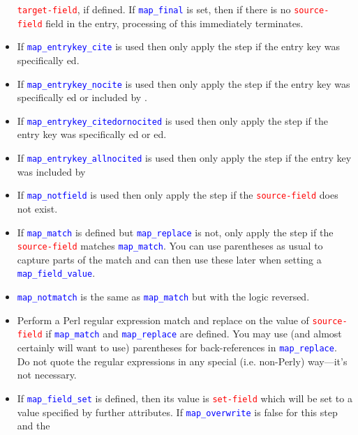 \documentclass{ltxdockit}
\begin{document}
\begin{itemize}
  \textcolor{red}{\texttt{target-field}}, if defined. If
  \textcolor{blue}{\texttt{map\_final}} is set, then if there is no
  \textcolor{red}{\texttt{source-field}} field in the entry, processing of
  this  immediately terminates.
\item If \textcolor{blue}{\texttt{map\_entrykey\_cite}} is used then only apply
  the step if the entry key was specifically ed.
\item If \textcolor{blue}{\texttt{map\_entrykey\_nocite}} is used then only apply
  the step if the entry key was specifically ed or included by .
\item If \textcolor{blue}{\texttt{map\_entrykey\_citedornocited}} is used then only apply
  the step if the entry key was specifically ed or ed.
\item If \textcolor{blue}{\texttt{map\_entrykey\_allnocited}} is used then only apply
  the step if the entry key was included by 
\item If \textcolor{blue}{\texttt{map\_notfield}} is used then only apply
  the step if the \textcolor{red}{\texttt{source-field}} does not exist.
\item If \textcolor{blue}{\texttt{map\_match}} is defined but
  \textcolor{blue}{\texttt{map\_replace}} is not, only apply the
  step if the \textcolor{red}{\texttt{source-field}} matches
  \textcolor{blue}{\texttt{map\_match}}. You can use parentheses as usual
  to capture parts of the match and can then use these later when setting a \textcolor{blue}{\texttt{map\_field\_value}}.
\item \textcolor{blue}{\texttt{map\_notmatch}} is the same as
  \textcolor{blue}{\texttt{map\_match}} but with the logic reversed.
\item Perform a Perl regular expression match and replace on the value of
  \textcolor{red}{\texttt{source-field}} if
  \textcolor{blue}{\texttt{map\_match}} and
  \textcolor{blue}{\texttt{map\_replace}} are defined. You may use (and almost certainly
  will want to use) parentheses for back-references in \textcolor{blue}{\texttt{map\_replace}}.
  Do not quote the regular expressions in any special (i.e. non-Perly) way---it's not
  necessary.
\item If \textcolor{blue}{\texttt{map\_field\_set}} is defined, then its
  value is \textcolor{red}{\texttt{set-field}} which will be set to a value
  specified by further attributes. If
  \textcolor{blue}{\texttt{map\_overwrite}} is false for this step and the

\end{itemize}
\end{document}
